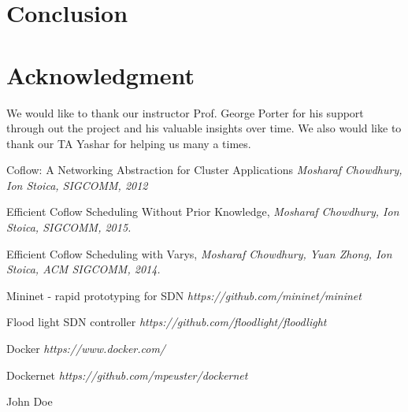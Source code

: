 \documentclass[conference]{IEEEtran}
\begin{document}
\section{Conclusion}

\section*{Acknowledgment}
We would like to thank our instructor Prof. George Porter for his support through out the project and his valuable insights over time. We also would like to thank our TA Yashar for helping us many a times. 

\begin{thebibliography}{99}

Coflow: A Networking Abstraction for Cluster Applications
\textit{Mosharaf Chowdhury, Ion Stoica, SIGCOMM, 2012}

Efficient Coflow Scheduling Without Prior Knowledge, 
\textit{Mosharaf Chowdhury, Ion Stoica, SIGCOMM, 2015.}

Efficient Coflow Scheduling with Varys, 
\textit{Mosharaf Chowdhury, Yuan Zhong, Ion Stoica, ACM SIGCOMM, 2014.}

Mininet - rapid prototyping for SDN
\textit{https://github.com/mininet/mininet}

Flood light SDN controller
\textit{https://github.com/floodlight/floodlight}

Docker
\textit{https://www.docker.com/}

Dockernet
\textit{https://github.com/mpeuster/dockernet}

\end{thebibliography}


\begin{IEEEbiography}{John Doe}
\blindtext
\end{IEEEbiography}
\end{document}
